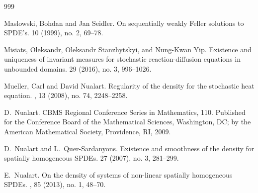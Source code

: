 \documentclass[a4paper,11pt]{article}
\theoremstyle{plain}
\theoremstyle{definition}
\numberwithin{NQ}{section}
\numberwithin{LQ}{section}
\numberwithin{ZQ}{section}
\begin{document}
\begin{small}
\begin{thebibliography}{999}

%

Maslowski, Bohdan and Jan Seidler.
\newblock On sequentially weakly Feller solutions to SPDE's. 
 10 (1999), no. 2, 69--78. 


Misiats, Oleksandr, Oleksandr Stanzhytskyi, and Nung-Kwan Yip.
\newblock Existence and uniqueness of invariant measures for stochastic reaction-diffusion equations in unbounded domains. 
 29 (2016), no. 3, 996--1026.

%





Mueller, Carl and David Nualart. 
\newblock Regularity of the density for the stochastic heat equation. 
, 13 (2008), no. 74, 2248--2258.


D.~Nualart.
\newblock CBMS Regional Conference Series in Mathematics, 110. Published for the
Conference Board of the Mathematical Sciences, Washington, DC; by the American
Mathematical Society, Providence, RI, 2009.

D.~Nualart and L.~Quer-Sardanyons.
\newblock Existence and smoothness of the density for spatially homogeneous {SPDEs}.
 27 (2007), no. 3, 281--299.

E.~Nualart.
\newblock On the density of systems of non-linear spatially homogeneous {SPDEs}.
, 85 (2013), no. 1, 48--70.


\end{thebibliography}
\end{small}
\end{document}
